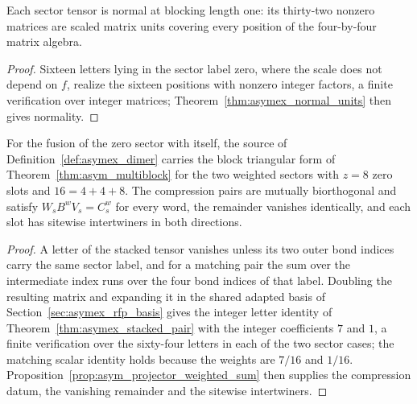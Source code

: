 \begin{theorem}
    \label{thm:asymex_dimer_normal}
    \leanok
    Each sector tensor is normal at blocking length one: its thirty-two
    nonzero matrices are scaled matrix units covering every position of the
    four-by-four matrix algebra.
\end{theorem}

\begin{proof}
    \leanok
    Sixteen letters lying in the sector label zero, where the scale does
    not depend on $f$, realize the sixteen positions with nonzero integer
    factors, a finite verification over integer matrices;
    Theorem~\ref{thm:asymex_normal_units} then gives normality.
\end{proof}

\begin{theorem}
    \label{thm:asymex_dimer_compression}
    \leanok
    For the fusion of the zero sector with itself, the source of
    Definition~\ref{def:asymex_dimer} carries the block triangular form of
    Theorem~\ref{thm:asym_multiblock} for the two weighted sectors with
    $z=8$ zero slots and $16=4+4+8$. The compression pairs are mutually
    biorthogonal and satisfy $W_sB^wV_s=C_s^w$ for every word, the
    remainder vanishes identically, and each slot has sitewise intertwiners
    in both directions.
\end{theorem}

\begin{proof}
    \leanok
    A letter of the stacked tensor vanishes unless its two outer bond
    indices carry the same sector label, and for a matching pair the sum
    over the intermediate index runs over the four bond indices of that
    label. Doubling the resulting matrix and expanding it in the shared
    adapted basis of Section~\ref{sec:asymex_rfp_basis} gives the integer
    letter identity of Theorem~\ref{thm:asymex_stacked_pair} with the
    integer coefficients $7$ and $1$, a finite verification over the
    sixty-four letters in each of the two sector cases; the matching scalar
    identity holds because the weights are $7/16$ and $1/16$.
    Proposition~\ref{prop:asym_projector_weighted_sum} then supplies the
    compression datum, the vanishing remainder and the sitewise
    intertwiners.
\end{proof}

